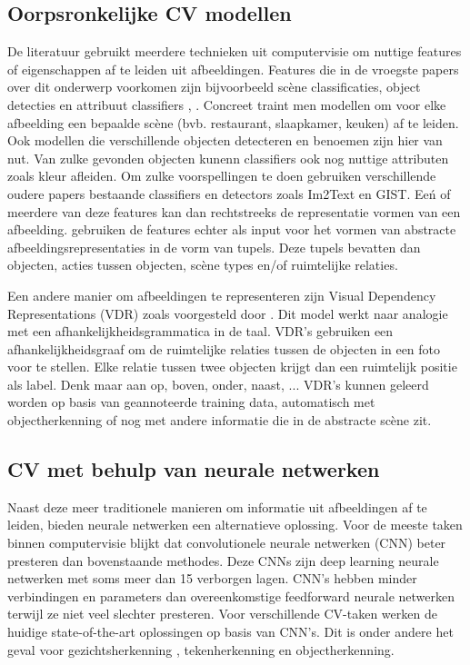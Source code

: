 \subsection{Oorpsronkelijke CV modellen}
De literatuur gebruikt meerdere technieken uit computervisie om nuttige features of eigenschappen af te leiden uit afbeeldingen. Features die in de vroegste papers over dit onderwerp voorkomen zijn bijvoorbeeld sc\`ene classificaties, object detecties en attribuut classifiers \cite{Farhadi2010},\cite{Yang2011}\cite{Patterson} . Concreet traint men modellen om voor elke afbeelding een bepaalde sc\`ene (bvb. restaurant, slaapkamer, keuken) af te leiden. Ook modellen die verschillende objecten detecteren en benoemen zijn hier van nut. Van zulke gevonden objecten kunenn classifiers ook nog nuttige attributen zoals kleur afleiden. Om zulke voorspellingen te doen gebruiken verschillende oudere papers bestaande classifiers en detectors zoals \cite{Felzenszwalb2008} Im2Text \cite{Ordonez2011} en GIST\cite{Oliva2006}.  Ee\'n of meerdere van deze features kan dan rechtstreeks de representatie vormen van een afbeelding.\cite{Farhadi2010} \cite{Yang2011} \cite{Li} \cite{Mitchell} gebruiken de features echter als input voor het vormen van abstracte afbeeldingsrepresentaties in de vorm van tupels. Deze tupels bevatten dan objecten, acties tussen objecten, sc\`ene types en/of ruimtelijke relaties.

Een andere manier om afbeeldingen te representeren zijn Visual Dependency Representations (VDR) zoals voorgesteld door \cite{Eliott2013}. Dit model werkt naar analogie met een afhankelijkheidsgrammatica in de taal. VDR's gebruiken een afhankelijkheidsgraaf om de ruimtelijke relaties tussen de objecten in een foto voor te stellen. Elke relatie tussen twee objecten krijgt dan een ruimtelijk positie als label. Denk maar aan  op, boven, onder, naast, ... VDR's kunnen geleerd worden op basis van geannoteerde training data, automatisch met objectherkenning \cite{Eliott2015} of nog met andere informatie die in de abstracte sc\`ene zit. \cite{Gilberto2015} 

\subsection{CV met behulp van neurale netwerken}
Naast deze meer traditionele manieren om informatie uit afbeeldingen af te leiden, bieden neurale netwerken een alternatieve oplossing.
Voor de meeste taken binnen computervisie blijkt dat convolutionele neurale netwerken (CNN) beter presteren dan bovenstaande methodes. Deze CNNs zijn deep learning neurale netwerken met soms meer dan 15 verborgen lagen. CNN's hebben minder verbindingen en parameters dan overeenkomstige feedforward neurale netwerken terwijl ze niet veel slechter presteren. \cite{Krizhevsky2012} 
Voor verschillende CV-taken werken de huidige state-of-the-art oplossingen op basis van CNN's. Dit is onder andere het geval voor gezichtsherkenning , tekenherkenning  en objectherkenning.


